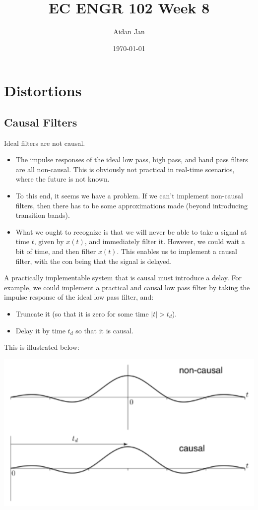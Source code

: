 \documentclass[10pt]{article}
\title{EC ENGR 102 Week 8}
\author{Aidan Jan}
\date{\today}
\begin{document}
\maketitle

\section*{Distortions}
\subsection*{Causal Filters}
Ideal filters are not causal.
\begin{itemize}
    \item The impulse responses of the ideal low pass, high pass, and band pass filters are all non-causal.  This is obviously not practical in real-time scenarios, where the future is not known.
    \item To this end, it seems we have a problem.  If we can't implement non-causal filters, then there has to be some approximations made (beyond introducing transition bands).
    \item What we ought to recognize is that we will never be able to take a signal at time $t$, given by $x(t)$, and immediately filter it.  However, we could wait a bit of time, and then filter $x(t)$.  This enables us to implement a causal filter, with the con being that the signal is delayed.
\end{itemize}
A practically implementable system that is causal must introduce a delay.  For example, we could implement a practical and causal low pass filter by taking the impulse response of the ideal low pass filter, and:
\begin{itemize}
    \item Truncate it (so that it is zero for some time $|t| > t_d$).
    \item Delay it by time $t_d$ so that it is causal.
\end{itemize}
This is illustrated below:
\begin{center}
    \includegraphics[width=\textwidth]{W8_1.png}
\end{center}
\end{document}
